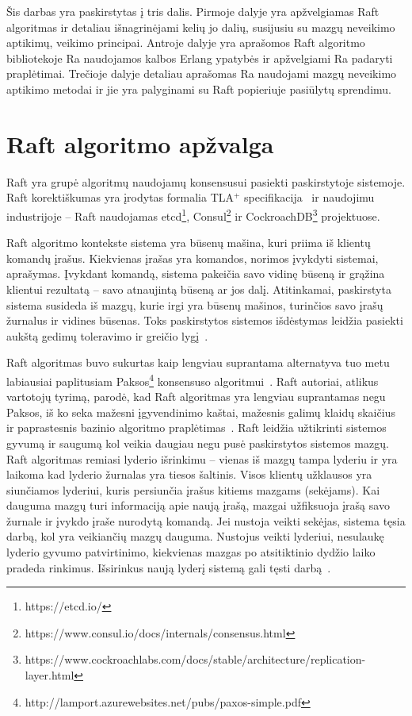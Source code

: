 \documentclass{VUMIFPSkursinis}
\begin{document}
Šis darbas yra paskirstytas į tris dalis. Pirmoje dalyje yra apžvelgiamas Raft algoritmas ir detaliau išnagrinėjami kelių jo dalių, susijusiu su mazgų neveikimo aptikimų, veikimo principai. Antroje dalyje yra aprašomos Raft algoritmo bibliotekoje Ra naudojamos kalbos Erlang ypatybės ir apžvelgiami Ra padaryti praplėtimai. Trečioje dalyje detaliau aprašomas Ra naudojami mazgų neveikimo aptikimo metodai ir jie yra palyginami su Raft popieriuje pasiūlytų sprendimu.

\section{Raft algoritmo apžvalga}

Raft yra grupė algoritmų naudojamų konsensusui pasiekti paskirstytoje sistemoje. Raft korektiškumas yra įrodytas formalia TLA$^+$ specifikacija~\cite{ongaro_consensus} ir naudojimu industrijoje -- Raft naudojamas etcd\footnote{https://etcd.io/}, Consul\footnote{https://www.consul.io/docs/internals/consensus.html} ir CockroachDB\footnote{https://www.cockroachlabs.com/docs/stable/architecture/replication-layer.html} projektuose. 

Raft algoritmo kontekste sistema yra būsenų mašina, kuri priima iš klientų komandų įrašus. Kiekvienas įrašas yra komandos, norimos įvykdyti sistemai, aprašymas. Įvykdant komandą, sistema pakeičia savo vidinę būseną ir grąžina klientui rezultatą -- savo atnaujintą būseną ar jos dalį. Atitinkamai, paskirstyta sistema susideda iš mazgų, kurie irgi yra būsenų mašinos, turinčios savo įrašų žurnalus ir vidines būsenas. Toks paskirstytos sistemos išdėstymas leidžia pasiekti aukštą gedimų toleravimo ir greičio lygį~\cite{ongaro_consensus, steen_distributed_2017}.

Raft algoritmas buvo sukurtas kaip lengviau suprantama alternatyva tuo metu labiausiai paplitusiam Paksos\footnote{http://lamport.azurewebsites.net/pubs/paxos-simple.pdf} konsensuso algoritmui~\cite{ongaro_consensus, diego_designing_2016}. Raft autoriai, atlikus vartotojų tyrimą, parodė, kad Raft algoritmas yra lengviau suprantamas negu Paksos, iš ko seka mažesni įgyvendinimo kaštai, mažesnis galimų klaidų skaičius ir paprastesnis bazinio algoritmo praplėtimas~\cite{ongaro_consensus}. Raft leidžia užtikrinti sistemos gyvumą ir saugumą kol veikia daugiau negu pusė paskirstytos sistemos mazgų. Raft algoritmas remiasi lyderio išrinkimu -- vienas iš mazgų tampa lyderiu ir yra laikoma kad lyderio žurnalas yra tiesos šaltinis. Visos klientų užklausos yra siunčiamos lyderiui, kuris persiunčia įrašus kitiems mazgams (sekėjams). Kai dauguma mazgų turi informaciją apie naują įrašą, mazgai užfiksuoja įrašą savo žurnale ir įvykdo įraše nurodytą komandą. Jei nustoja veikti sekėjas, sistema tęsia darbą, kol yra veikiančių mazgų dauguma. Nustojus veikti lyderiui, nesulaukę lyderio gyvumo patvirtinimo, kiekvienas mazgas po atsitiktinio dydžio laiko pradeda rinkimus. Išsirinkus naują lyderį sistemą gali tęsti darbą~\cite{ongaro_consensus}. 
\end{document}

